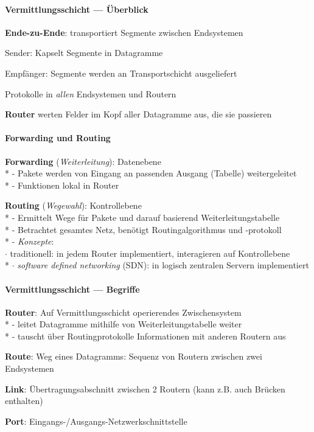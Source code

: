 \paragraph{Vermittlungsschicht --- Überblick}
\begin{items}
  \item \textbf{Ende-zu-Ende}: transportiert Segmente zwischen Endsystemen
  \item Sender: Kapselt Segmente in Datagramme
  \item Empfänger: Segmente werden an Transportschicht ausgeliefert
  \item Protokolle in \emph{allen} Endsystemen und Routern
  \item \textbf{Router} werten Felder im Kopf aller Datagramme aus, die sie passieren
\end{items}

\paragraph{Forwarding und Routing}
\begin{items}
  \item \textbf{Forwarding} (\emph{Weiterleitung}): Datenebene \\*
    - Pakete werden von Eingang an passenden Ausgang (Tabelle) weitergeleitet\\*
    - Funktionen lokal in Router
    \smallskip
  \item \textbf{Routing} (\emph{Wegewahl}): Kontrollebene \\*
    - Ermittelt Wege für Pakete und darauf basierend Weiterleitungstabelle \\*
    - Betrachtet gesamtes Netz, benötigt Routingalgorithmus und -protokoll\\*
    - \emph{Konzepte}: \\
    \phantom{-} \( \cdot \) traditionell: in jedem Router implementiert, interagieren auf Kontrollebene \\*
    \phantom{-} \( \cdot \) \emph{software defined networking} (SDN): in logisch zentralen Servern implementiert
\end{items}

\paragraph{Vermittlungsschicht --- Begriffe}
\begin{items}
  \item \textbf{Router}: Auf Vermittlungsschicht operierendes Zwischensystem \\*
    - leitet Datagramme mithilfe von Weiterleitungstabelle weiter \\*
    - tauscht über Routingprotokolle Informationen mit anderen Routern aus
  \item \textbf{Route}: Weg eines Datagramms: Sequenz von Routern zwischen zwei Endsystemen
  \item \textbf{Link}: Übertragungsabschnitt zwischen 2 Routern (kann z.B. auch Brücken enthalten)
  \item \textbf{Port}: Eingangs-/Ausgangs-Netzwerkschnittstelle
\end{items}

